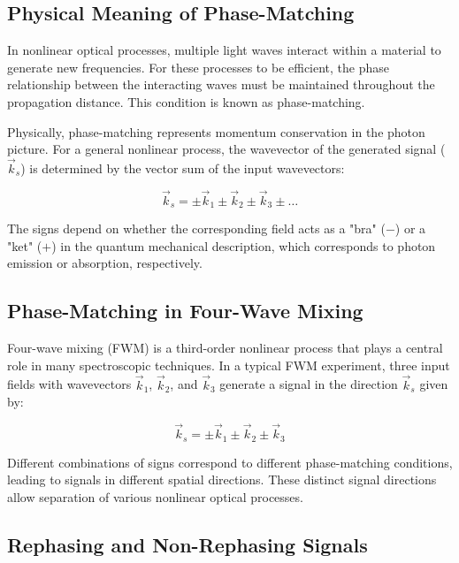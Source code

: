 \subsection{Physical Meaning of Phase-Matching}
\label{subsec:phase_matching_meaning}

\noindent In nonlinear optical processes, multiple light waves interact within a material to generate new frequencies. For these processes to be efficient, the phase relationship between the interacting waves must be maintained throughout the propagation distance. This condition is known as phase-matching.

\noindent Physically, phase-matching represents momentum conservation in the photon picture. For a general nonlinear process, the wavevector of the generated signal ($\vec{k}_s$) is determined by the vector sum of the input wavevectors:

\begin{equation}
    \vec{k}_s = \pm\vec{k}_1 \pm\vec{k}_2 \pm\vec{k}_3 \pm \ldots
    \label{eq:phase_matching}
\end{equation}

\noindent The signs depend on whether the corresponding field acts as a "bra" ($-$) or a "ket" ($+$) in the quantum mechanical description, which corresponds to photon emission or absorption, respectively.

\subsection{Phase-Matching in Four-Wave Mixing}
\label{subsec:fwm_phase_matching}

\noindent Four-wave mixing (FWM) is a third-order nonlinear process that plays a central role in many spectroscopic techniques. In a typical FWM experiment, three input fields with wavevectors $\vec{k}_1$, $\vec{k}_2$, and $\vec{k}_3$ generate a signal in the direction $\vec{k}_s$ given by:

\begin{equation}
    \vec{k}_s = \pm\vec{k}_1 \pm\vec{k}_2 \pm\vec{k}_3
    \label{eq:fwm_phase_matching}
\end{equation}

\noindent Different combinations of signs correspond to different phase-matching conditions, leading to signals in different spatial directions. These distinct signal directions allow separation of various nonlinear optical processes.

\subsection{Rephasing and Non-Rephasing Signals}
\label{subsec:rephasing_nonrephasing}

